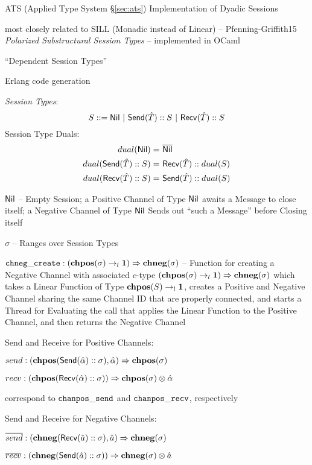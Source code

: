 ATS (Applied Type System \S\ref{sec:ats}) Implementation of Dyadic
Sessions

most closely related to SILL (Monadic instead of Linear) --
Pfenning-Griffith15 \emph{Polarized Substructural Session Types} --
implemented in OCaml %

``Dependent Session Types''

Erlang code generation

\emph{Session Types}:
\[
  S ::= \Nil \ |\ \Send(\hat{T}) :: S \ |\ \Recv(\hat{T}) :: S
\]
Session Type Duals:
\begin{align*}
  dual(\mathsf{Nil})              =&\ \overline{\mathsf{Nil}} \\
  dual(\mathsf{Send}(\hat{T})::S) =&\ \mathsf{Recv}(\hat{T}) :: dual(S) \\
  dual(\mathsf{Recv}(\hat{T})::S) =&\ \mathsf{Send}(\hat{T}) :: dual(S)
\end{align*}

$\mathsf{Nil}$ -- Empty Session; a Positive Channel of Type $\mathsf{Nil}$ awaits a
Message to close itself; a Negative Channel of Type $\mathsf{Nil}$ Sends out
``such a Message'' before Closing itself %

$\sigma$ -- Ranges over Session Types

$\mathtt{chneg\_create} : (\mathbf{chpos}(\sigma) \rightarrow_l \mathbf{1})
\Rightarrow \mathbf{chneg}(\sigma)$ -- Function for creating a Negative
Channel with associated $c$-type $(\mathbf{chpos}(\sigma) \rightarrow_l
\mathbf{1}) \Rightarrow \mathbf{chneg}(\sigma)$ which takes a Linear Function
of Type $\mathbf{chpos}(S) \rightarrow_l \mathbf{1}$, creates a Positive and
Negative Channel sharing the same Channel ID that are properly
connected, and starts a Thread for Evaluating the call that applies
the Linear Function to the Positive Channel, and then returns the
Negative Channel

Send and Receive for Positive Channels:

$send : (\mathbf{chpos} (\mathsf{Send}(\hat{\alpha}) :: \sigma), \hat{\alpha})
\Rightarrow \mathbf{chpos}(\sigma)$

$recv : (\mathbf{chpos} (\mathsf{Recv}(\hat{\alpha}) :: \sigma)) \Rightarrow
\mathbf{chpos}(\sigma) \otimes \hat{\alpha}$

correspond to $\mathtt{chanpos\_send}$ and $\mathtt{chanpos\_recv}$,
respectively

Send and Receive for Negative Channels:

$\overline{send} : (\mathbf{chneg}(\mathsf{Recv}(\hat{a}) :: \sigma), \hat{a})
\Rightarrow \mathbf{chneg}(\sigma)$

$\overline{recv} : (\mathbf{chneg}(\mathsf{Send}(\hat{a}) :: \sigma)) \Rightarrow
\mathbf{chneg}(\sigma) \otimes \hat{a}$


